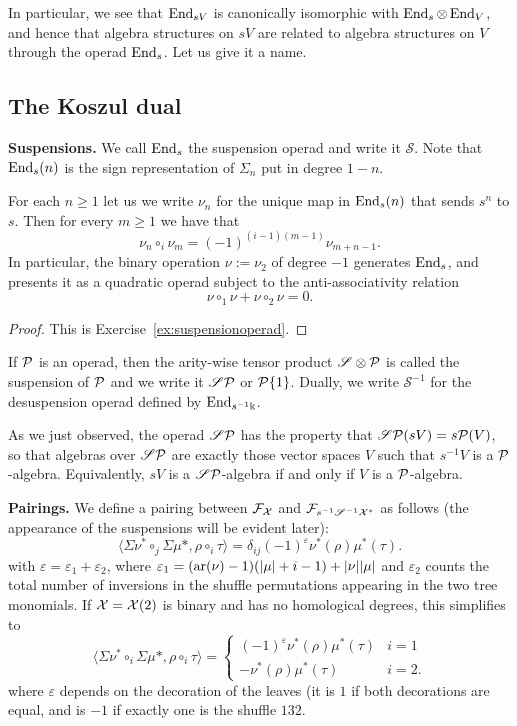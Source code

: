 In particular, we see that $\operatorname{End}_{sV}$ is canonically isomorphic
with $\operatorname{End}_s\otimes \operatorname{End}_V$, and hence that algebra structures on $sV$
are related to algebra structures on $V$ through the operad $\operatorname{End}_s$.
Let us give it a name. 

\subsection{The Koszul dual}

\newcommand{\sus}{\mathscr{S}}
\textbf{Suspensions.} 
We call $\operatorname{End}_{s}$ the suspension operad
and write it $\sus$. Note that $\operatorname{End}_{s}(n)$ is
the sign representation of $\Sigma_n$ put in degree $1-n$.

\begin{proposition} For each $n\geqslant 1$ let us
we write $\nu_n$ for the unique map in $\operatorname{End}_s(n)$ 
that sends $s^n$ to $s$. Then for every $m\geqslant 1$
we have that
\[ \nu_n \circ_i \nu_m = (-1)^{(i-1)(m-1)} \nu_{m+n-1}. \]
In particular, the binary operation $\nu := \nu_2$ of degree
$-1$ generates $\operatorname{End}_s$,
and presents it as a quadratic operad subject to the 
anti-associativity relation
\[ \nu \circ_1\nu + \nu\circ_2 \nu = 0.\]
\end{proposition}
\begin{proof}
 This is Exercise~\ref{ex:suspensionoperad}.
\end{proof}

If ${\mathcal{P}}$ is an operad, then the arity-wise tensor product
$\sus\otimes \PP$ is called the suspension of ${\mathcal{P}}$
and we write it $\sus\PP$ or ${\mathcal{P}}\{1\}$. Dually, we
write $\sus^{-1}$ for the desuspension operad
defined by $\operatorname{End}_{s^{-1}\Bbbk}$. 

\begin{note} As we just observed,
the operad  $\sus\PP$ has the property that
$\sus\PP(sV) = s\PP(V)$, so that algebras over $\sus\PP$
are exactly those vector spaces $V$ such that $s^{-1}V$ is a
${\mathcal{P}}$-algebra. Equivalently, $sV$ is a $\sus\PP$-algebra
if and only if $V$ is a ${\mathcal{P}}$-algebra. 
\end{note}

\textbf{Pairings.} We define a pairing between $\mathcal{F}_{\mathcal{X}}$ and
$\FF_{s^{-1}\sus^{-1}\XX^*}$ as follows (the appearance of
the suspensions will be evident later):
\[ \langle \Sigma\nu^* \circ_j \Sigma\mu*, 
	\rho \circ_i \tau  \rangle
   = \delta_{ij} (-1)^{\varepsilon}
   	\nu^*(\rho)\mu^*(\tau). \]
with $\varepsilon = \varepsilon_1+\varepsilon_2$,
where $\varepsilon_1 = (\operatorname{ar}(\nu)-1)(|\mu|+i-1)+|\nu||\mu|$ 
and $\varepsilon_2$ counts the total
number of inversions in the shuffle permutations
appearing in the two tree monomials.
If $\mathcal{X} = \mathcal{X}(2)$ is binary and has no homological degrees, 
this simplifies to
\[ \langle \Sigma\nu^* \circ_i \Sigma\mu*, 
	\rho \circ_i \tau  \rangle
   =  \begin{cases}
    	(-1)^\varepsilon \nu^*(\rho)\mu^*(\tau) & i=1 \\
    	-	\nu^*(\rho)\mu^*(\tau) & i = 2.
    	\end{cases} \] 
where $\varepsilon$ depends on the decoration
of the leaves (it is $1$ if both decorations
are equal, and is $-1$ if exactly one is the
shuffle $132$. 

